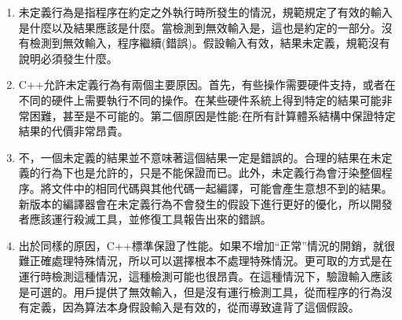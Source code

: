 \begin{enumerate}
\item 
未定義行為是指程序在約定之外執行時所發生的情況，規範規定了有效的輸入是什麼以及結果應該是什麼。當檢測到無效輸入是，這也是約定的一部分。沒有檢測到無效輸入，程序繼續(錯誤)。假設輸入有效，結果未定義，規範沒有說明必須發生什麼。

\item 
C++允許未定義行為有兩個主要原因。首先，有些操作需要硬件支持，或者在不同的硬件上需要執行不同的操作。在某些硬件系統上得到特定的結果可能非常困難，甚至是不可能的。第二個原因是性能:在所有計算體系結構中保證特定結果的代價非常昂貴。

\item 
不，一個未定義的結果並不意味著這個結果一定是錯誤的。合理的結果在未定義的行為下也是允許的，只是不能保證而已。此外，未定義行為會汙染整個程序。將文件中的相同代碼與其他代碼一起編譯，可能會產生意想不到的結果。新版本的編譯器會在未定義行為不會發生的假設下進行更好的優化，所以開發者應該運行殺滅工具，並修復工具報告出來的錯誤。

\item
出於同樣的原因，C++標準保證了性能。如果不增加“正常”情況的開銷，就很難正確處理特殊情況，所以可以選擇根本不處理特殊情況。更可取的方式是在運行時檢測這種情況，這種檢測可能也很昂貴。在這種情況下，驗證輸入應該是可選的。用戶提供了無效輸入，但是沒有運行檢測工具，從而程序的行為沒有定義，因為算法本身假設輸入是有效的，從而導致違背了這個假設。

\end{enumerate}
